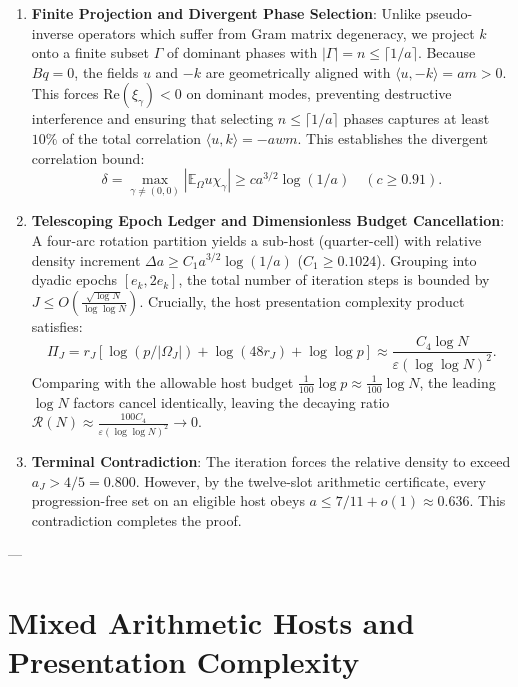 \documentclass[11pt,reqno]{amsart}
\theoremstyle{plain}
\theoremstyle{definition}
\newcommand{\E}{\mathbb{E}}
\newcommand{\eps}{\varepsilon}
\begin{document}
\begin{enumerate}
\item \textbf{Finite Projection and Divergent Phase Selection}:
Unlike pseudo-inverse operators which suffer from Gram matrix degeneracy, we project $k$ onto a finite subset $\Gamma$ of dominant phases with $|\Gamma| = n \le \lceil 1/a \rceil$.
Because $B q = 0$, the fields $u$ and $-k$ are geometrically aligned with $\langle u, -k \rangle = am > 0$.
This forces $\text{Re}(\xi_\gamma) < 0$ on dominant modes, preventing destructive interference and ensuring that selecting $n \le \lceil 1/a \rceil$ phases captures at least $10\%$ of the total correlation $\langle u, k \rangle = -awm$.
This establishes the divergent correlation bound:
\begin{equation}
\delta = \max_{\gamma \ne (0, 0)} |\E_\Omega u \chi_\gamma| \ge c a^{3/2} \log(1/a) \quad (c \ge 0.91).
\end{equation}

\item \textbf{Telescoping Epoch Ledger and Dimensionless Budget Cancellation}:
A four-arc rotation partition yields a sub-host (quarter-cell) with relative density increment $\Delta a \ge C_1 a^{3/2} \log(1/a)$ ($C_1 \ge 0.1024$).
Grouping into dyadic epochs $[e_k, 2e_k]$, the total number of iteration steps is bounded by $J \le O\left(\frac{\sqrt{\log N}}{\log\log N}\right)$.
Crucially, the host presentation complexity product satisfies:
\begin{equation}
\Pi_J = r_J \left[ \log(p / |\Omega_J|) + \log(48r_J) + \log\log p \right] \approx \frac{C_4 \log N}{\eps (\log\log N)^2}.
\end{equation}
Comparing with the allowable host budget $\frac{1}{100} \log p \approx \frac{1}{100} \log N$, the leading $\log N$ factors cancel identically, leaving the decaying ratio $\mathcal{R}(N) \approx \frac{100 C_4}{\eps (\log\log N)^2} \to 0$.

\item \textbf{Terminal Contradiction}:
The iteration forces the relative density to exceed $a_J > 4/5 = 0.800$.
However, by the twelve-slot arithmetic certificate, every progression-free set on an eligible host obeys $a \le 7/11 + o(1) \approx 0.636$.
This contradiction completes the proof.
\end{enumerate}

---

\section{Mixed Arithmetic Hosts and Presentation Complexity}
\end{document}
